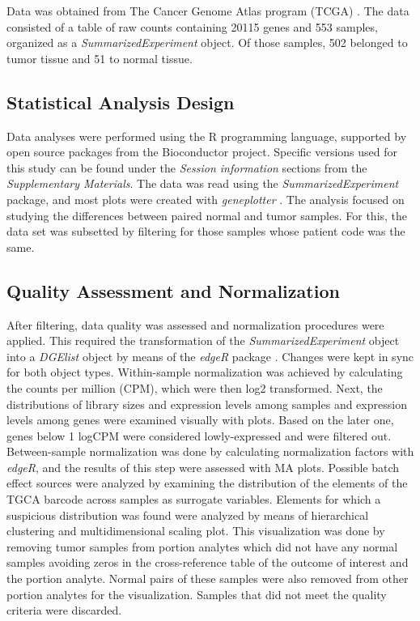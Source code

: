 \documentclass[9pt,twocolumn,twoside]{gsajnl}
\begin{document}
Data was obtained from The Cancer Genome Atlas program (TCGA) \citep{atlas}. The data consisted of a table of raw counts containing 20115 genes and 553 samples, organized as a \textit{SummarizedExperiment} object. Of those samples, 502 belonged to tumor tissue and 51 to normal tissue.

\subsection{Statistical Analysis Design}

Data analyses were performed using the R programming language, supported by open source packages from the Bioconductor project. Specific versions used for this study can be found under the \textit{Session information} \citep{se} sections from the \textit{Supplementary Materials}. The data was read using the \textit{SummarizedExperiment} package, and most plots were created with \textit{geneplotter} \citep{geneplotter}. The analysis focused on studying the differences between paired normal and tumor samples. For this, the data set was subsetted by filtering for those samples whose patient code was the same.

\subsection{Quality Assessment and Normalization}

After filtering, data quality was assessed and normalization procedures were applied. This required the transformation of the \textit{SummarizedExperiment} object into a \textit{DGElist} object by means of the \textit{edgeR} package \citep{edger1, edger2}. Changes were kept in sync for both object types. Within-sample normalization was achieved by calculating the counts per million (CPM), which were then log2 transformed. Next, the distributions of library sizes and expression levels among samples and expression levels among genes were examined visually with plots. Based on the later one, genes below 1 logCPM were considered lowly-expressed and were filtered out. Between-sample normalization was done by calculating normalization factors with \textit{edgeR}, and the results of this step were assessed with MA plots. Possible batch effect sources were analyzed by examining the distribution of the elements of the TGCA barcode across samples as surrogate variables. Elements for which a suspicious distribution was found were analyzed by means of hierarchical clustering and multidimensional scaling plot. This visualization was done by removing tumor samples from portion analytes which did not have any normal samples avoiding zeros in the cross-reference table of the outcome of interest and the portion analyte. Normal pairs of these samples were also removed from other portion analytes for the visualization. Samples that did not meet the quality criteria were discarded.
\end{document}
